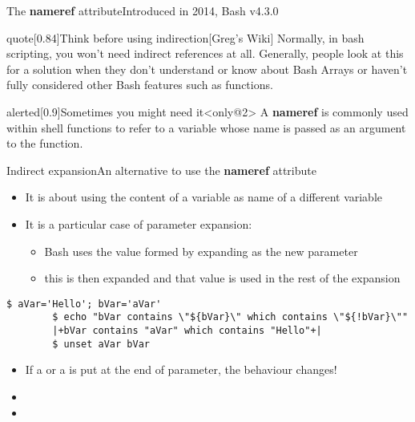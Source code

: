 \begin{frame}[fragile]{The \textbf{nameref} attribute}{Introduced in 2014, Bash v4.3.0}
\begin{varblock}{quote}[0.84\textwidth]{Think before using indirection}[Greg's Wiki]
        \smallskip
        Normally, in bash scripting, you won't need indirect references at all.
        Generally, people look at this for a solution when they don't understand or know about Bash Arrays or haven't fully considered other Bash features such as functions.
        \smallskip
    \end{varblock}
    \begin{varblock}{alerted}[0.9\textwidth]{Sometimes you might need it}<only@2>
        A \textbf{nameref} is commonly used within shell functions to refer to a variable whose name is passed as an argument to the function.
    \end{varblock}
\end{frame}
\begin{frame}[fragile]{Indirect expansion}{An alternative to use the \textbf{nameref} attribute}
    \vspace{-3mm}
    \begin{itemize}
        \item It is about using the content of a variable as name of a different variable
        \item It is a particular case of parameter expansion: 
              \begin{itemize}
                  \item Bash uses the value formed by expanding  as the new parameter
                  \item this is then expanded and that value is used in the rest of the expansion
              \end{itemize}
    \end{itemize}
    \begin{lstlisting}[style=MyBash, xrightmargin=1mm, belowskip=-4mm]
        $ aVar='Hello'; bVar='aVar'
        $ echo "bVar contains \"${bVar}\" which contains \"${!bVar}\""
        |+bVar contains "aVar" which contains "Hello"+|
        $ unset aVar bVar
    \end{lstlisting}
    \begin{itemize}[<2>]
        \item If a \PB{\texttt{*}} or a  is put at the end of parameter, the behaviour changes!\\[0.3em]
        \small\setlength{\itemsep}{0mm}
        \item[] 
        \item[] 

\end{itemize}
\end{frame}
